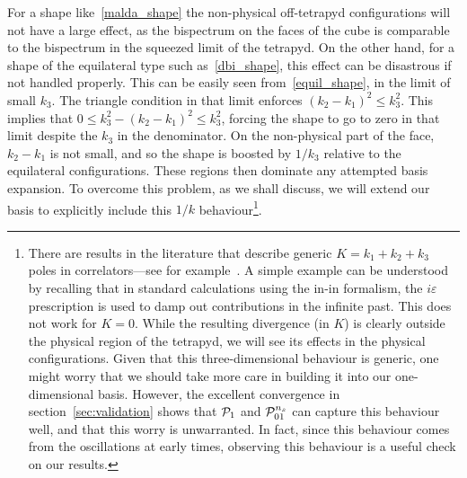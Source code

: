 For a shape like~\eqref{malda_shape} the non-physical off-tetrapyd configurations
will not have a large effect, as the bispectrum on the faces of the cube is comparable
to the bispectrum in the squeezed limit of the tetrapyd.
On the other hand, for a shape of the equilateral type such as~\eqref{dbi_shape},
this effect can be disastrous if not handled properly.
This can be easily seen from~\eqref{equil_shape}, in the limit of small $k_3$.
The triangle condition in that limit enforces ${(k_2-k_1)^2\leq k^2_3}$.
This implies that ${0\leq k^2_3-(k_2-k_1)^2\leq k^2_3}$,
forcing the shape to go to zero in that limit despite the $k_3$
in the denominator.
On the non-physical part of the face, $k_2-k_1$ is not small,
and so the shape is boosted by $1/k_3$ relative to the equilateral configurations.
These regions then dominate any attempted basis expansion.
To overcome this problem, as we shall discuss, we will extend our basis to explicitly include this $1/k$ behaviour\footnote{
    There are results in the literature that describe
    generic $K=k_1+k_2+k_3$ poles
    in correlators---see for example~\cite{cosmo_bootstrap}.
    A simple example can be understood by recalling that
    in standard calculations using the in-in formalism, the $i\varepsilon$ prescription
    is used to damp out contributions in the infinite past.
    This does not work for $K=0$. While the resulting
    divergence (in $K$) is clearly outside the physical region of the tetrapyd,
    we will see its effects in the physical configurations.
    Given that this three-dimensional behaviour is generic, one might worry that we should
    take more care in building it into our one-dimensional basis.
    However, the excellent convergence in
    section~\ref{sec:validation}
    shows that $\mathcal{P}_1$ and $\mathcal{P}^{n_s}_{01}$ can capture this behaviour well,
    and that this worry is unwarranted.
    In fact, since this behaviour comes from the oscillations
    at early times, observing this behaviour is a useful
    check on our results.%
}.

